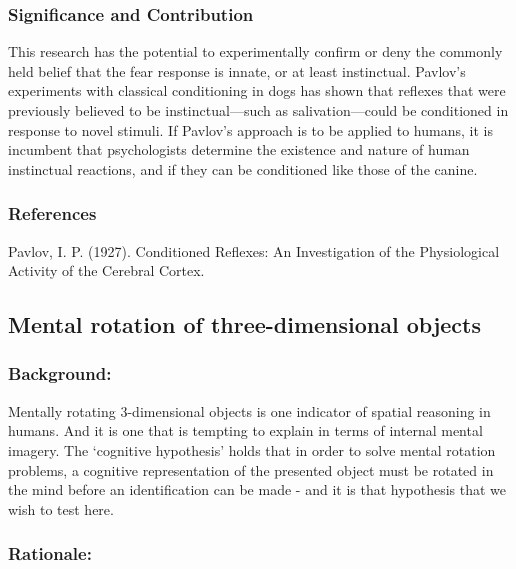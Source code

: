 \subsubsection{Significance and Contribution}
\label{significanceandcontribution}

This research has the potential to experimentally confirm or deny the commonly held belief that the fear response is innate, or at least instinctual. Pavlov's experiments with classical conditioning in dogs has shown that reflexes that were previously believed to be instinctual---such as salivation---could be conditioned in response to novel stimuli. If Pavlov's approach is to be applied to humans, it is incumbent that psychologists determine the existence and nature of human instinctual reactions, and if they can be conditioned like those of the canine.

\subsubsection{References}
\label{references}

Pavlov, I. P. (1927). Conditioned Reflexes: An Investigation of the Physiological Activity of the Cerebral Cortex.

\newpage

\subsection{Mental rotation of three-dimensional objects}
\label{mentalrotationofthree-dimensionalobjects}

\subsubsection{Background:}
\label{background:}

Mentally rotating 3-dimensional objects is one indicator of spatial reasoning in humans. And it is one that is tempting to explain in terms of internal mental imagery. The `cognitive hypothesis' holds that in order to solve mental rotation problems, a cognitive representation of the presented object must be rotated in the mind before an identification can be made - and it is that hypothesis that we wish to test here.

\subsubsection{Rationale:}
\label{rationale:}

